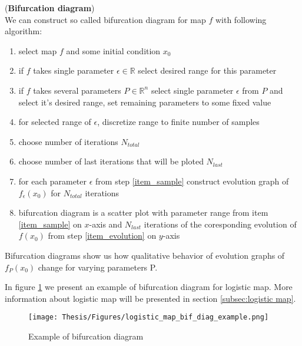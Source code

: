 \begin{definition} (\textbf{Bifurcation diagram}) \\
    \label{def: bif_diag}
    We can construct so called bifurcation diagram for map $f$ with following algorithm:
    \begin{enumerate}
        \item select map $f$ and some initial condition $x_0$
        \item if $f$ takes single parameter $\epsilon \in \mathbb{R}$ select desired range for this parameter
        \item if $f$ takes several parameters $P \in \mathbb{R}^n$ select single parameter $\epsilon$ from $P$ and select it's desired range, set remaining parameters to some fixed value
        \item for selected range of $\epsilon$, discretize range to finite number of samples \label{item_sample}
        \item choose number of iterations $N_{total}$
        \item choose number of last iterations that will be ploted $N_{last}$
        \item for each parameter $\epsilon$ from step \ref{item_sample} construct evolution graph of $f_{\epsilon}(x_0)$ for $N_{total}$ iterations \label{item_evolution}
        \item bifurcation diagram is a scatter plot with parameter range from item \ref{item_sample} on $x$-axis and $N_{last}$ iterations of the coresponding evolution of $f(x_0)$ from step \ref{item_evolution} on $y$-axis
    \end{enumerate}
\end{definition}

\begin{remark}
    Bifurcation diagrams show us how qualitative behavior of evolution graphs of $f_P(x_0)$ change for varying parameters P.
\end{remark}

\begin{example}
    In figure \ref{fig:bif_diag_example} we present an example of bifurcation diagram for logistic map. More information about logistic map will be presented in section \ref{subsec:logistic map}.
    \begin{figure}[!h]
        \centering
        \texttt{[image: Thesis/Figures/logistic\_map\_bif\_diag\_example.png]}
        \caption{Example of bifurcation diagram}
        \label{fig:bif_diag_example}
    \end{figure}
\end{example}


